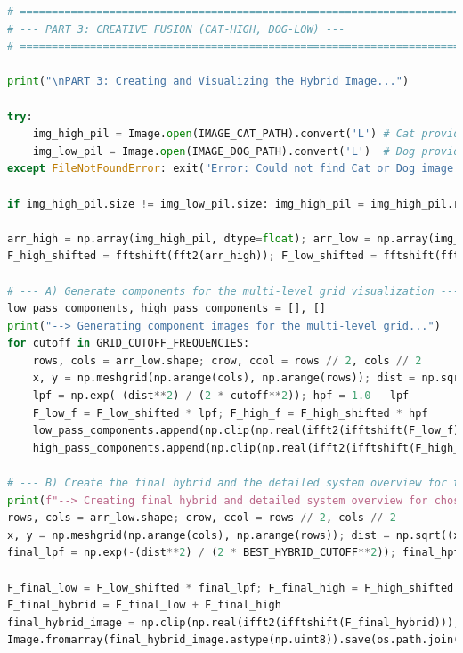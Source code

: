 \documentclass[11pt, a4paper]{article}
\begin{document}
\begin{lstlisting}[language=Python, caption={Python script for Question 1.}]
# ============================================================================
# --- PART 3: CREATIVE FUSION (CAT-HIGH, DOG-LOW) ---
# ============================================================================

print("\nPART 3: Creating and Visualizing the Hybrid Image...")

try:
    img_high_pil = Image.open(IMAGE_CAT_PATH).convert('L') # Cat provides high frequencies
    img_low_pil = Image.open(IMAGE_DOG_PATH).convert('L')  # Dog provides low frequencies
except FileNotFoundError: exit("Error: Could not find Cat or Dog image. Aborting.")

if img_high_pil.size != img_low_pil.size: img_high_pil = img_high_pil.resize(img_low_pil.size)

arr_high = np.array(img_high_pil, dtype=float); arr_low = np.array(img_low_pil, dtype=float)
F_high_shifted = fftshift(fft2(arr_high)); F_low_shifted = fftshift(fft2(arr_low))

# --- A) Generate components for the multi-level grid visualization ---
low_pass_components, high_pass_components = [], []
print("--> Generating component images for the multi-level grid...")
for cutoff in GRID_CUTOFF_FREQUENCIES:
    rows, cols = arr_low.shape; crow, ccol = rows // 2, cols // 2
    x, y = np.meshgrid(np.arange(cols), np.arange(rows)); dist = np.sqrt((x - ccol)**2 + (y - crow)**2)
    lpf = np.exp(-(dist**2) / (2 * cutoff**2)); hpf = 1.0 - lpf
    F_low_f = F_low_shifted * lpf; F_high_f = F_high_shifted * hpf
    low_pass_components.append(np.clip(np.real(ifft2(ifftshift(F_low_f))), 0, 255))
    high_pass_components.append(np.clip(np.real(ifft2(ifftshift(F_high_f))) + 128, 0, 255))

# --- B) Create the final hybrid and the detailed system overview for the BEST cutoff ---
print(f"--> Creating final hybrid and detailed system overview for chosen cutoff = {BEST_HYBRID_CUTOFF}...")
rows, cols = arr_low.shape; crow, ccol = rows // 2, cols // 2
x, y = np.meshgrid(np.arange(cols), np.arange(rows)); dist = np.sqrt((x - ccol)**2 + (y - crow)**2)
final_lpf = np.exp(-(dist**2) / (2 * BEST_HYBRID_CUTOFF**2)); final_hpf = 1.0 - final_lpf

F_final_low = F_low_shifted * final_lpf; F_final_high = F_high_shifted * final_hpf
F_final_hybrid = F_final_low + F_final_high
final_hybrid_image = np.clip(np.real(ifft2(ifftshift(F_final_hybrid))), 0, 255)
Image.fromarray(final_hybrid_image.astype(np.uint8)).save(os.path.join(OUTPUT_DIR, 'Cat-Dog_Hybrid_Final.png'))


\end{lstlisting}
\end{document}
